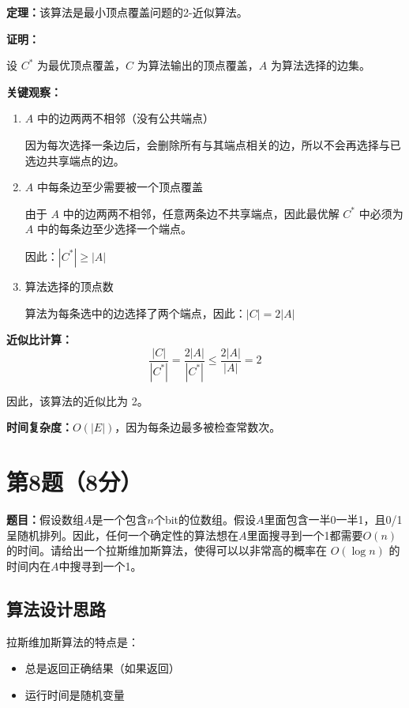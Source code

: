 \documentclass[UTF8,12pt,a4paper]{ctexart}
\begin{document}
\textbf{定理：}该算法是最小顶点覆盖问题的2-近似算法。

\textbf{证明：}

设 $C^*$ 为最优顶点覆盖，$C$ 为算法输出的顶点覆盖，$A$ 为算法选择的边集。

\textbf{关键观察：}
\begin{enumerate}
	\item $A$ 中的边两两不相邻（没有公共端点）
	
	因为每次选择一条边后，会删除所有与其端点相关的边，所以不会再选择与已选边共享端点的边。
	
	\item $A$ 中每条边至少需要被一个顶点覆盖
	
	由于 $A$ 中的边两两不相邻，任意两条边不共享端点，因此最优解 $C^*$ 中必须为 $A$ 中的每条边至少选择一个端点。
	
	因此：$|C^*| \geq |A|$
	
	\item 算法选择的顶点数
	
	算法为每条选中的边选择了两个端点，因此：$|C| = 2|A|$
\end{enumerate}

\textbf{近似比计算：}
$$\frac{|C|}{|C^*|} = \frac{2|A|}{|C^*|} \leq \frac{2|A|}{|A|} = 2$$

因此，该算法的近似比为 2。

\textbf{时间复杂度：}$O(|E|)$，因为每条边最多被检查常数次。


\section*{第8题（8分）}
\textbf{题目：}假设数组$A$是一个包含$n$个bit的位数组。假设$A$里面包含一半0一半1，且0/1呈随机排列。因此，任何一个确定性的算法想在$A$里面搜寻到一个1都需要$O(n)$的时间。请给出一个拉斯维加斯算法，使得可以以非常高的概率在 $O(\log n)$ 的时间内在$A$中搜寻到一个1。

\subsection*{算法设计思路}

拉斯维加斯算法的特点是：
\begin{itemize}
	\item 总是返回正确结果（如果返回）
	\item 运行时间是随机变量
\end{itemize}
\end{document}

